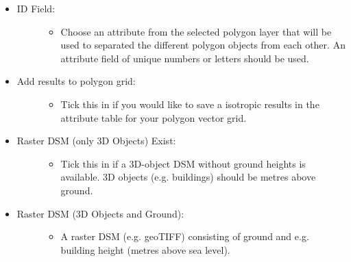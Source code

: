 \documentclass[letterpaper,10pt,english]{sphinxmanual}
\begin{document}
\begin{itemize}
\begin{description}
\begin{itemize}
\end{itemize}

\end{description}

\item {} \begin{description}
\item[{ID Field:}] \leavevmode\begin{itemize}
\item {} 
Choose an attribute from the selected polygon layer that will be used to separated the different polygon objects from each other. An attribute field of unique numbers or letters should be used.

\end{itemize}

\end{description}

\item {} \begin{description}
\item[{Add results to polygon grid:}] \leavevmode\begin{itemize}
\item {} 
Tick this in if you would like to save a isotropic results in the attribute table for your polygon vector grid.

\end{itemize}

\end{description}

\item {} \begin{description}
\item[{Raster DSM (only 3D Objects) Exist:}] \leavevmode\begin{itemize}
\item {} 
Tick this in if a 3D-object DSM without ground heights is available. 3D objects (e.g. buildings) should be metres above ground.

\end{itemize}

\end{description}

\item {} \begin{description}
\item[{Raster DSM (3D Objects and Ground):}] \leavevmode\begin{itemize}
\item {} 
A raster DSM (e.g. geoTIFF) consisting of ground and e.g. building height (metres above sea level).


\end{itemize}
\end{description}
\end{itemize}
\end{document}
